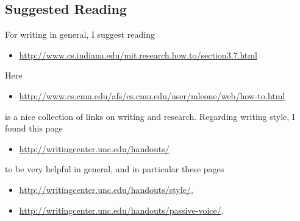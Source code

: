 \documentclass[twocolumn, a4paper, 10pt]{article}
\begin{document}
\subsection{Suggested Reading}
For writing in general, I suggest reading
\begin{itemize}
	\item \url{http://www.cs.indiana.edu/mit.research.how.to/section3.7.html}
\end{itemize}
Here
\begin{itemize}
	\item \url{http://www.cs.cmu.edu/afs/cs.cmu.edu/user/mleone/web/how-to.html}
\end{itemize}
is a nice collection of links on writing and research.
Regarding writing style, I found this page
\begin{itemize}
	\item \url{http://writingcenter.unc.edu/handouts/}
\end{itemize}
to be very helpful in general, and in particular these pages
\begin{itemize}
	\item \url{http://writingcenter.unc.edu/handouts/style/}, 
	\item \url{http://writingcenter.unc.edu/handouts/passive-voice/}.
\end{itemize}



\end{document}

